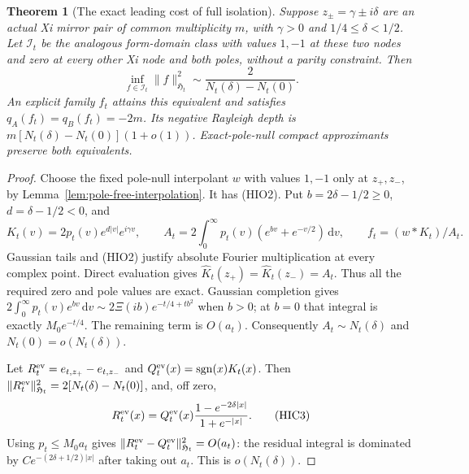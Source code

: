 \documentclass[11pt]{article}
\newtheorem{theorem}{Theorem}
\theoremstyle{remark}\newtheorem{remark}[theorem]{Remark}
\newcommand{\dd}{\,\mathrm d}
\begin{document}
\begin{theorem}[The exact leading cost of full isolation]
\label{thm:optimal-isolated-heat-constant}
Suppose $z_\pm=\gamma\pm i\delta$ are an actual Xi mirror pair
of common multiplicity $m$, with $\gamma>0$ and $1/4\le\delta<1/2$.
Let $\mathcal I_t$ be the analogous form-domain class with values
$1,-1$ at these two nodes and zero at every other Xi node and both
poles, without a parity constraint. Then
\[
 \inf_{f\in\mathcal I_t}\|f\|_{\mathfrak H_t}^2
                  \sim\frac{2}{N_t(\delta)-N_t(0)}.           \tag{HIC1}
\]
An explicit family $f_t$ attains this equivalent and satisfies
$q_A(f_t)=q_B(f_t)=-2m$. Its negative Rayleigh depth is
$m[N_t(\delta)-N_t(0)](1+o(1))$.
Exact-pole-null compact approximants preserve both equivalents.
\end{theorem}
\begin{proof}
Choose the fixed pole-null interpolant $w$ with values $1,-1$
only at $z_+,z_-$, by Lemma~\ref{lem:pole-free-interpolation}.
It has (HIO2). Put $b=2\delta-1/2\ge0$, $d=\delta-1/2<0$, and
\[
 K_t(v)=2p_t(v)e^{d|v|}e^{i\gamma v},\qquad
 A_t=2\int_0^\infty p_t(v)(e^{bv}+e^{-v/2})\dd v,
 \qquad f_t=(w*K_t)/A_t.                                    \tag{HIC2}
\]
Gaussian tails and (HIO2) justify absolute Fourier multiplication
at every complex point. Direct evaluation gives
$\widehat K_t(z_+)=\widehat K_t(z_-)=A_t$.
Thus all the required zero and pole values are exact. Gaussian
completion gives
$2\int_0^\infty p_t(v)e^{bv}\dd v
\sim2\Xi(ib)e^{-t/4+tb^2}$ when $b>0$; at $b=0$ that integral
is exactly $M_0e^{-t/4}$. The remaining term is $O(a_t)$.
Consequently $A_t\sim N_t(\delta)$ and $N_t(0)=o(N_t(\delta))$.

Let $R_t^{\rm ev}=e_{t,z_+}-e_{t,z_-}$ and
$Q_t^{\rm ev}(x)=\operatorname{sgn}(x)K_t(x)$.
Then $\|R_t^{\rm ev}\|_{\mathfrak H_t}^2=2[N_t(\delta)-N_t(0)]$,
and, off zero,
\[
 R_t^{\rm ev}(x)=Q_t^{\rm ev}(x)
                 \frac{1-e^{-2\delta|x|}}{1+e^{-|x|}}.
                                                               \tag{HIC3}
\]
Using $p_t\le M_0a_t$ gives
$\|R_t^{\rm ev}-Q_t^{\rm ev}\|_{\mathfrak H_t}^2=O(a_t)$:
the residual integral is dominated by
$Ce^{-(2\delta+1/2)|x|}$ after taking out $a_t$.
This is $o(N_t(\delta))$.


\end{proof}
\end{document}
